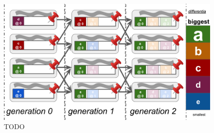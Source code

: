 \begin{figure}
  \centering
  \includegraphics[width=\textwidth]{img/gene-drive}
  \caption{
    TODO
  }
  \label{fig:gene-drive}
\end{figure}
